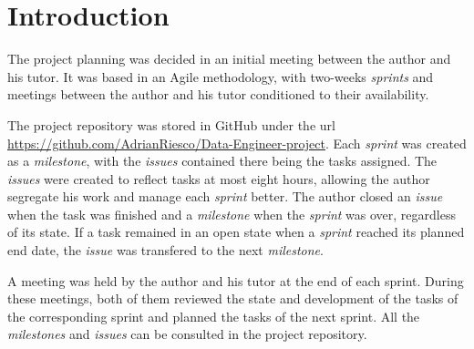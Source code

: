 
\section{Introduction}
\nonzeroparskip The project planning was decided in an initial meeting between the author and his tutor. It was based in an Agile methodology, with two-weeks \textit{sprints} and meetings between the author and his tutor conditioned to their availability.

\nonzeroparskip The project repository was stored in GitHub under the url \url{https://github.com/AdrianRiesco/Data-Engineer-project}. Each \textit{sprint} was created as a \textit{milestone}, with the \textit{issues} contained there being the tasks assigned. The \textit{issues} were created to reflect tasks at most eight hours, allowing the author segregate his work and manage each \textit{sprint} better. The author closed an \textit{issue} when the task was finished and a \textit{milestone} when the \textit{sprint} was over, regardless of its state. If a task remained in an open state when a \textit{sprint} reached its planned end date, the \textit{issue} was transfered to the next \textit{milestone}.

\nonzeroparskip A meeting was held by the author and his tutor at the end of each sprint. During these meetings, both of them reviewed the state and development of the tasks of the corresponding sprint and planned the tasks of the next sprint. All the \textit{milestones} and \textit{issues} can be consulted in the project repository.

